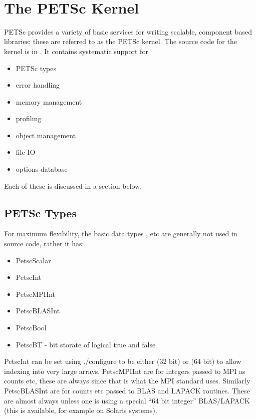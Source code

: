 \documentclass[twoside,12pt]{../sty/report_petsc}
\begin{document}
\newpage
\hbox{ }
\newpage

\chapter{The PETSc Kernel}
\label{chapter:kernel}
PETSc provides a variety of basic services for writing scalable, component 
based libraries; these are referred to as the PETSc kernel. The source
code for the kernel is in . It contains systematic support for
\begin{itemize}
  \item PETSc types
  \item error handling
  \item memory management
  \item profiling
  \item object management
  \item file IO
  \item options database
\end{itemize}
Each of these is discussed in a section below.

\section{PETSc Types}
For maximum flexibility, the basic data types ,  etc are 
generally not used in source code, rather it has:
\begin{itemize}
  \item PetscScalar 
  \item PetscInt
  \item PetscMPIInt
  \item PetscBLASInt
  \item PetscBool 
  \item PetscBT  - bit storate of logical true and false
\end{itemize}
PetscInt can be set using ./configure to be either  (32 bit) or 
(64 bit)
to allow indexing into very large arrays. PetscMPIInt are for integers passed to MPI
as counts etc, these are always  since that is what the MPI standard uses. Similarly
PetscBLASInt are for counts etc passed to BLAS and LAPACK routines. These are almost always
 unless one is using a special ``64 bit integer'' BLAS/LAPACK (this is available, for 
example on Solaris systems).
\end{document}
